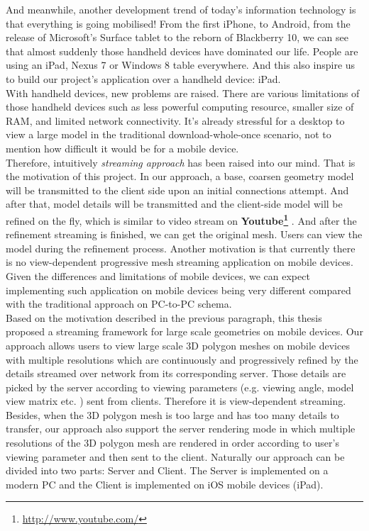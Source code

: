 And meanwhile, another development trend of today's information technology is that everything is going mobilised! From the first iPhone, to Android, from the release of Microsoft's Surface tablet to the reborn of Blackberry 10, we can see that almost suddenly those handheld devices have dominated our life. People are using an iPad, Nexus 7 or Windows 8 table everywhere. And this also inspire us to build our project's application over a handheld device: iPad. \\

With handheld devices, new problems are raised. There are various limitations of those handheld devices such as less powerful computing resource, smaller size of RAM, and limited network connectivity. It's already stressful for a desktop to view a large model in the traditional download-whole-once scenario, not to mention how difficult it would be for a mobile device. \\

Therefore, intuitively \emph{streaming approach} has been raised into our mind. That is the motivation of this project. In our approach, a base, coarsen geometry model will be transmitted to the client side upon an initial connections attempt. And after that, model details will be transmitted and the client-side model will be refined on the fly, which is similar to video stream on \textbf{Youtube\footnote{\label{UTUBE}\url{http://www.youtube.com/}} }. And after the refinement streaming is finished, we can get the original mesh. Users can view the model during the refinement process. Another motivation is that currently there is no view-dependent progressive mesh streaming application on mobile devices. Given the differences and limitations of mobile devices, we can expect implementing such application on mobile devices being very different compared with the traditional approach on PC-to-PC schema.  \\

Based on the motivation described in the previous paragraph, this thesis proposed a streaming framework for large scale geometries on mobile devices. Our approach allows users to view large scale 3D polygon meshes on mobile devices with multiple resolutions which are continuously and progressively refined by the details streamed over network from its corresponding server. Those details are picked by the server according to viewing parameters (e.g. viewing angle, model view matrix etc. ) sent from clients. Therefore it is view-dependent streaming. Besides, when the 3D polygon mesh is too large and has too many details to transfer, our approach also support the server rendering mode in which multiple resolutions of the 3D polygon mesh are rendered in order according to user's viewing parameter and then sent to the client. Naturally our approach can be divided into two parts: Server and Client. The Server is implemented on a modern PC and the Client is implemented on iOS mobile devices (iPad).


